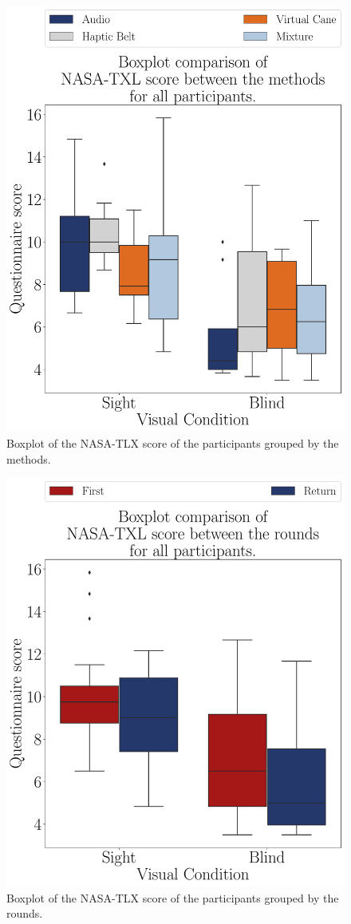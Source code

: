 \begin{figure}[!htb]
    \centering
    \includegraphics[width = 0.75\linewidth]{Resultados/Nasa/Figuras/pdf/boxplot_noBase_nasa_4_scene.pdf}
    \caption{Boxplot of the NASA-TLX score of the participants grouped by the methods.}
    \label{fig:boxplot_noBase_nasa_4_scene}
\end{figure}
\begin{figure}[!htb]
    \centering
    \includegraphics[width = 0.75\linewidth]{Resultados/Nasa/Figuras/pdf/boxplot_noBase_nasa_4_rounds.pdf}
    \caption{Boxplot of the NASA-TLX score of the participants grouped by the rounds.}
    \label{fig:boxplot_noBase_nasa_4_rounds}
\end{figure}

